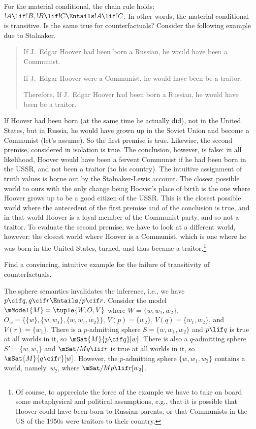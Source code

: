 \documentclass[../../../include/open-logic-section]{subfiles}
\begin{document}


For the material conditional, the chain rule holds: $!A \lif !B, !B
\lif !C \Entails !A \lif !C$. In other words, the material conditional
is transitive. Is the same true for counterfactuals? Consider the
following example due to Stalnaker.
\begin{quote}
  If J.~Edgar Hoover had been born a Russian, he would have been a Communist.

  If J.~Edgar Hoover were a Communist, he would have been be a traitor.

  Therefore, If J.~Edgar Hoover had been born a Russian, he would have
  been be a traitor.
\end{quote}
If Hoover had been born (at the same time he actually did), not in the
United States, but in Russia, he would have grown up in the Soviet
Union and become a Communist (let's assume). So the first premise is
true. Likewise, the second premise, considered in isolation is
true. The conclusion, however, is false: in all likelihood, Hoover
would have been a fervent Communist if he had been born in the USSR,
and not been a traitor (to his country).  The intuitive assignment of
truth values is borne out by the Stalnaker-Lewis account. The closest
possible world to ours with the only change being Hoover's place of
birth is the one where Hoover grows up to be a good citizen of the
USSR. This is the closest possible world where the antecedent of the
first premise and of the conclusion is true, and in that world Hoover
is a loyal member of the Communist party, and so not a traitor. To
evaluate the second premise, we have to look at a different world,
however: the closest world where Hoover is a Communist, which is one
where he was born in the United States, turned, and thus became a
traitor.\footnote{Of course, to appreciate the force of the example we
  have to take on board some metaphysical and political assumptions,
  e.g., that it is possible that Hoover could have been born to
  Russian parents, or that Communists in the US of the 1950s were
  traitors to their country.}

\begin{prob}
  Find a convincing, intuitive example for the failure of transitivity
  of counterfactuals.
\end{prob}

\begin{ex}
  The sphere semantics invalidates the inference, i.e., we have $p
  \cif q, q \cif r \Entails/ p \cif r$. Consider the model $\mModel{M}
  = \tuple{W, O, V}$ where $W = \{w, w_1, w_2\}$, $O_w = \{\{w\}, \{w,
  w_1\}, \{w, w_1, w_2\}\}$, $V(p) = \{w_2\}$, $V(q) = \{w_1, w_2\}$,
  and $V(r) = \{w_1\}$. There is a $p$-admitting sphere $S = \{w, w_1,
  w_2\}$ and $p \lif q$ is true at all worlds in it, so $\mSat{M}{p
    \cif q}[w]$. There is also a $q$-admitting sphere $S' = \{w,
  w_1\}$ and $\mSat/{M}{q \lif r}$ is true at all worlds in it, so
  $\mSat{M}{q \cif r}[w]$. However, the $p$-admitting sphere $\{w,
  w_1, w_2\}$ contains a world, namely~$w_2$, where $\mSat/{M}{p \lif
    r}[w_2]$.
\end{ex}
\end{document}
